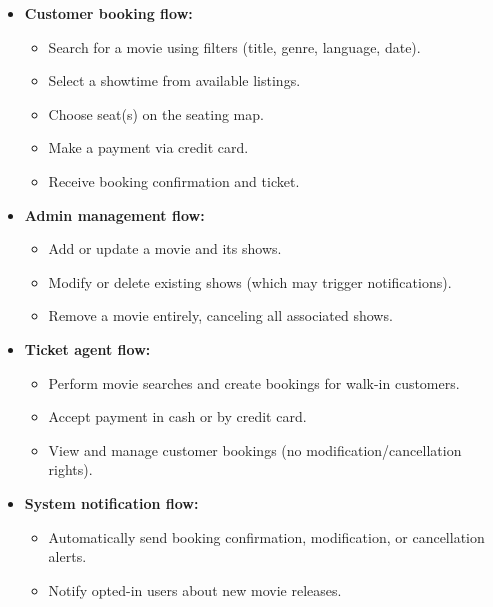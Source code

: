 \begin{itemize}
\item
\protect{}\label{McUDH5nGqEpsdnexZL4Ok}
\textbf{Customer booking flow:}

\begin{itemize}
\item
Search for a movie using filters (title, genre, language, date).
\item
Select a showtime from available listings.
\item
Choose seat(s) on the seating map.
\item
Make a payment via credit card.
\item
Receive booking confirmation and ticket.
\end{itemize}
\item
\protect{}\label{IFJOCUaWMw0iujEQYo6pf}
\textbf{Admin management flow:}

\begin{itemize}
\item
Add or update a movie and its shows.
\item
Modify or delete existing shows (which may trigger notifications).
\item
Remove a movie entirely, canceling all associated shows.
\end{itemize}
\item
\protect{}\label{OQs-ISBynbbUeTOMoUkHv}
\textbf{Ticket agent flow:}

\begin{itemize}
\item
Perform movie searches and create bookings for walk-in customers.
\item
Accept payment in cash or by credit card.
\item
View and manage customer bookings (no modification/cancellation rights).
\end{itemize}
\item
\protect{}\label{gZTM0BYUcoYzDFJIDZq3m}
\textbf{System notification flow:}

\begin{itemize}
\item
Automatically send booking confirmation, modification, or cancellation alerts.
\item
Notify opted-in users about new movie releases.
\end{itemize}
\end{itemize}

